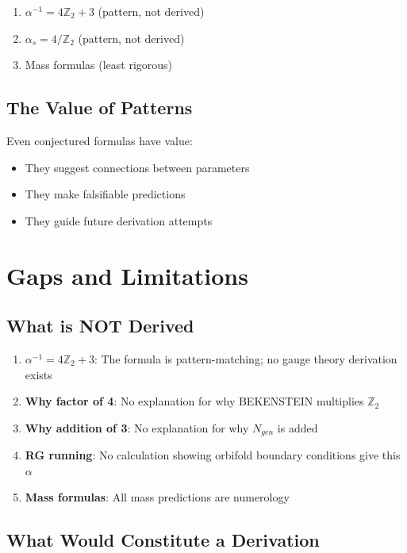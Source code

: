 \documentclass[12pt,a4paper]{article}
\begin{document}
\begin{enumerate}
    \item $\alpha^{-1} = 4\mathbb{Z}_2 + 3$ (pattern, not derived)
    \item $\alpha_s = 4/\mathbb{Z}_2$ (pattern, not derived)
    \item Mass formulas (least rigorous)
\end{enumerate}

\subsection{The Value of Patterns}

Even conjectured formulas have value:
\begin{itemize}
    \item They suggest connections between parameters
    \item They make falsifiable predictions
    \item They guide future derivation attempts
\end{itemize}

\section{Gaps and Limitations}

\subsection{What is NOT Derived}

\begin{enumerate}
    \item \textbf{$\alpha^{-1} = 4\mathbb{Z}_2 + 3$}: The formula is pattern-matching; no gauge theory derivation exists
    \item \textbf{Why factor of 4}: No explanation for why BEKENSTEIN multiplies $\mathbb{Z}_2$
    \item \textbf{Why addition of 3}: No explanation for why $N_{gen}$ is added
    \item \textbf{RG running}: No calculation showing orbifold boundary conditions give this $\alpha$
    \item \textbf{Mass formulas}: All mass predictions are numerology
\end{enumerate}

\subsection{What Would Constitute a Derivation}
\end{document}
